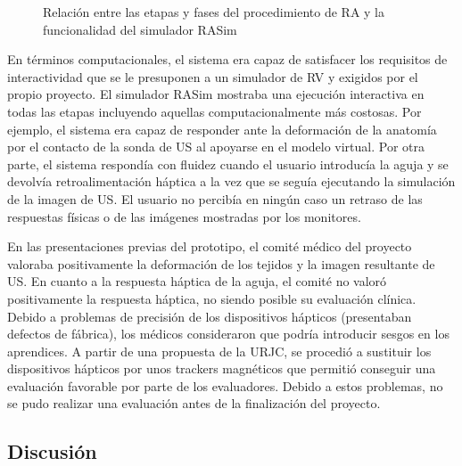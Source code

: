  
\begin{figure}
    \centering
       \caption{Relación entre las etapas y fases del procedimiento de \ac{RA} y la funcionalidad del simulador \ac{RASim} }
    \label{fig:RAsteps}
\end{figure}

En términos computacionales, el sistema era capaz de satisfacer los requisitos de interactividad que se le presuponen a un simulador de \ac{RV} y exigidos por el propio proyecto. El simulador \ac{RASim} mostraba una ejecución interactiva en todas las etapas incluyendo aquellas computacionalmente más costosas. Por ejemplo, el sistema era capaz de responder ante la deformación de la anatomía por el contacto de la sonda de \ac{US} al apoyarse en el modelo virtual. Por otra parte, el sistema respondía con fluidez cuando el usuario introducía la aguja y se devolvía retroalimentación háptica a la vez que se seguía ejecutando la simulación de la imagen de \ac{US}. El usuario no percibía en ningún caso un retraso de las respuestas físicas o de las imágenes mostradas por los monitores.

En las presentaciones previas del prototipo, el comité médico del proyecto valoraba positivamente la deformación de los tejidos y la imagen resultante de \ac{US}. En cuanto a  la respuesta háptica de la aguja, el comité no valoró positivamente la respuesta háptica, no siendo posible su evaluación clínica. Debido a problemas de precisión de los dispositivos hápticos (presentaban defectos de fábrica), los médicos consideraron que podría introducir sesgos en los aprendices. A partir de una propuesta de la \ac{URJC}, se procedió a sustituir los dispositivos hápticos por unos \acs{tracker}s magnéticos que permitió conseguir una evaluación favorable por parte de los evaluadores. Debido a estos problemas, no se pudo realizar una evaluación antes de la finalización del proyecto.






\subsection{Discusión}
\label{rasim:discusion}


